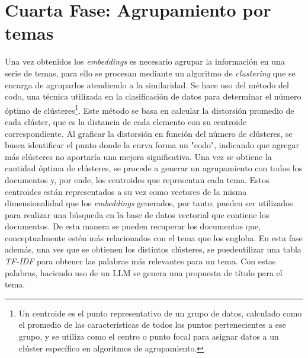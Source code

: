     \section{Cuarta Fase: Agrupamiento por temas}
    Una vez obtenidos los \emph{embeddings} es necesario agrupar la información en una serie de temas, para ello se procesan mediante un algoritmo de \emph{clustering} que se encarga de agruparlos atendiendo a la similaridad. Se hace uso del método del codo, una técnica utilizada en la clasificación de datos para determinar el número óptimo de clústeres\footnote{Un centroide es el punto representativo de un grupo de datos, calculado como el promedio de las características de todos los puntos pertenecientes a ese grupo, y se utiliza como el centro o punto focal para asignar datos a un clúster específico en algoritmos de agrupamiento.}. Este método se basa en calcular la distorsión promedio de cada clúster, que es la distancia de cada elemento con su centroide correspondiente. Al graficar la distorsión en función del número de clústeres, se busca identificar el punto donde la curva forma un "codo", indicando que agregar más clústeres no aportaría una mejora significativa. Una vez se obtiene la cantidad óptima de clústeres, se procede a generar un agrupamiento con todos los documentos y, por ende, los centroides que representan cada tema. Estos centroides están representados a su vez como vectores de la misma dimensionalidad que los \emph{embeddings} generados, por tanto; pueden ser utilizados para realizar una búsqueda en la base de datos vectorial que contiene los documentos. De esta manera se pueden recuperar los documentos que, conceptualmente estén más relacionados con el tema que los engloba. En esta fase además, una ves que se obtienen los distintos clústeres, se puedeutilizar una tabla \emph{TF-IDF} para obtener las palabras más relevantes para un tema. Con estas palabras, haciendo uso de un LLM se genera una propuesta de título para el tema.

